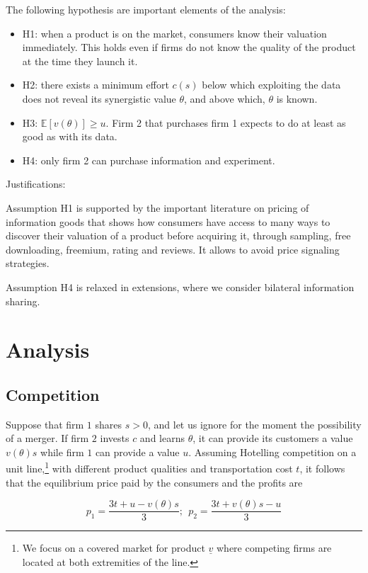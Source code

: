\documentclass[a4paper,leqno]{article}%
\newcommand{\E}{\mathbb E}
\renewcommand{\t}{\theta}
\newcommand{\uv}{\underline v}
\begin{document}
The following hypothesis are important elements of the analysis:

\begin{itemize}[label={--}]
    \item H1: when a product is on the market, consumers know their valuation immediately. This holds even if firms do not know the quality of the product at the time they launch it. 
    \item H2: there exists a minimum effort $c(s)$ below which exploiting the data does not reveal its synergistic value $\t$, and above which, $\t$ is known.
    \item H3: $\E[v(\t)]\geq u$. Firm 2 that purchases firm 1 expects to do at least as good as with its data. 
    \item H4: only firm 2 can purchase information and experiment.
\end{itemize}

Justifications:

Assumption H1 is supported by the important literature on pricing of information goods \citep{shapiro1998information} that shows how consumers have access to many ways to discover their valuation of a product before acquiring it, through sampling, free downloading, freemium, rating and reviews. It allows to avoid price signaling strategies.

Assumption H4 is relaxed in extensions, where we consider bilateral information sharing. 


\section{Analysis}

\subsection{Competition}


Suppose that firm $1$ shares $s>0$, and let us ignore for the moment the possibility of a merger. If firm $2$ invests $c$ and learns $\t$, it can provide its customers a value $v(\t)s$ while firm $1$ can provide a value $u$. Assuming Hotelling competition on a unit line,\footnote{We focus on a covered market for product $\uv$ where competing firms are located at both extremities of the line.} with different product qualities and transportation cost $t$, it follows that the equilibrium price paid by the consumers and the profits are

\begin{equation}\label{comp}
    p_1=\frac{3t+u-v(\t)s}{3};~~ p_2=\frac{3t+v(\t)s-u}{3}
\end{equation}
\end{document}
